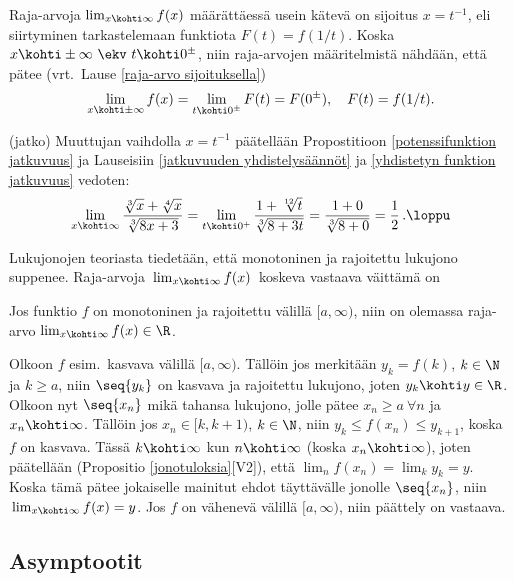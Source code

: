 Raja-arvoja $\lim_{x\kohti\infty} f(x)$ määrättäessä usein kätevä on sijoitus $x=t^{-1}$, eli
siirtyminen tarkastelemaan funktiota $F(t)=f(1/t)$. Koska 
$x\kohti\pm\infty\ \ekv\ t\kohti 0^\pm$, niin raja-arvojen määritelmistä nähdään, että pätee
(vrt.\ Lause \ref{raja-arvo sijoituksella})
\[
\lim_{x\kohti\pm\infty} f(x) = \lim_{t\kohti 0^\pm} F(t) = F(0^\pm), \quad F(t)=f(1/t).
\]
\begin{Exa} (jatko) Muuttujan vaihdolla $x=t^{-1}$ päätellään Propostitioon 
\ref{potenssifunktion jatkuvuus} ja Lauseisiin \ref{jatkuvuuden yhdistelysäännöt} ja 
\ref{yhdistetyn funktion jatkuvuus} vedoten:
\[
\lim_{x\kohti\infty} \frac{\sqrt[3]{x}+\sqrt[4]{x}}{\sqrt[3]{8x+3}} 
                 = \lim_{t\kohti 0^+} \frac{1+\sqrt[12]{t}}{\sqrt[3]{8+3t}}
                 = \frac{1+0}{\sqrt[3]{8+0}} = \frac{1}{2}\,. \loppu
\]
\end{Exa}
Lukujonojen teoriasta tiedetään, että monotoninen ja rajoitettu lukujono suppenee.
Raja-arvoja $\,\lim_{x\kohti\infty}f(x)\,$ koskeva vastaava väittämä on
\begin{Lause} \label{monotonisen funktion raja-arvo} Jos funktio $f$ on monotoninen ja
rajoitettu välillä $[a,\infty)$, niin on olemassa raja-arvo $\lim_{x\kohti\infty}f(x)\in\R$.
\end{Lause}
\tod Olkoon $f$ esim.\ kasvava välillä $[a,\infty)$. Tällöin jos merkitään $y_k=f(k)$,
$k\in\N$ ja $k \ge a$, niin $\seq{y_k}$ on kasvava ja rajoitettu lukujono, joten
$y_k \kohti y\in\R$. Olkoon nyt $\seq{x_n}$ mikä tahansa lukujono, jolle pätee
$x_n\ge a\ \forall n$ ja $x_n\kohti\infty$. Tällöin jos $x_n\in[k,k+1)$, $k\in\N$, niin
$y_k \le f(x_n) \le y_{k+1}$, koska $f$ on kasvava. Tässä $k\kohti\infty$ kun $n\kohti\infty$
(koska $x_n\kohti\infty$), joten päätellään (Propositio \ref{jonotuloksia}[V2]), että
$\lim_nf(x_n)=\lim_ky_k=y$. Koska tämä pätee jokaiselle mainitut ehdot täyttävälle jonolle
$\seq{x_n}$, niin $\,\lim_{x\kohti\infty}f(x)=y$. Jos $f$ on vähenevä välillä $[a,\infty)$, niin
päättely on vastaava. \loppu

\subsection*{Asymptootit}

